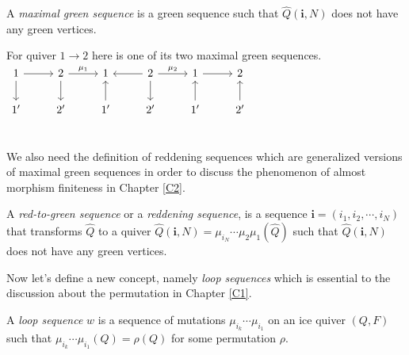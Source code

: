 \begin{definition}
A \textit{maximal green sequence} is a green sequence such that $\hat{Q}(\mathbf{i},N)$ does not have any green vertices.
\end{definition}
\begin{example} For quiver $1\to 2$ here is one of its two maximal green sequences.\\
 $\begin{tikzcd}
1 \arrow[r] \arrow[d] & 2\arrow [d]\arrow[r,"\mu_1"]  & 1&2\arrow[l]\arrow[d]\arrow[r,"\mu_2"]&1\arrow[r] & 2\\
1' & 2'&1'\arrow[u]& 2'&1'\arrow[u] & 2'\arrow[u]\\
\end{tikzcd}$
\end{example}
\indent We also need the definition of reddening sequences which are generalized versions of maximal green sequences in order to discuss the phenomenon of almost morphism finiteness in Chapter \ref{C2}.\\
\begin{definition}
A \textit{red-to-green sequence} or a \textit{reddening sequence}, is a sequence $\mathbf{i}=(i_1, i_2,\cdots, i_N)$ that transforms $\hat{Q}$ to a quiver $\hat{Q}(\mathbf{i},N) = \mu_{i_N}\cdots\mu_2\mu_1(\hat{Q})$ such that $\hat{Q}(\mathbf{i},N)$ does not have any green vertices.\cite{Mul15}\\
\end{definition}
\indent Now let's define a new concept, namely \textit{loop sequences} which is essential to the discussion about the permutation in Chapter \ref{C1}.\\
\begin{definition} 
A \textit{loop sequence} $w$ is a sequence of mutations $\mu_{i_k}\cdots\mu_{i_1}$ on an ice quiver $(Q,F)$ such that $\mu_{i_k}\cdots\mu_{i_1}(Q) = \rho(Q)$ for some permutation $\rho$.\\
\end{definition}
